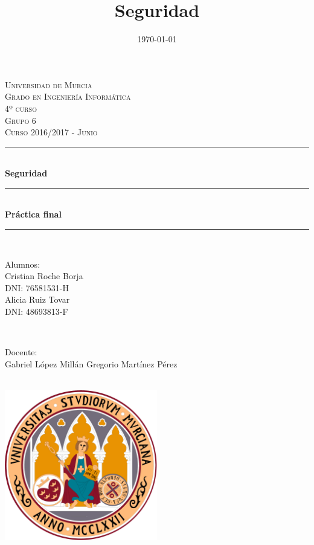 \documentclass[a4,12pt,onecolum]{article}
\title{Seguridad}
\date{\today}
\begin{document}

\begin{titlepage}

\newcommand{\HRule}{\rule{\linewidth}{0.5mm}} %

\center %

\textsc{\LARGE Universidad de Murcia}\\[0.8cm]
\textsc{\Large Grado en Ingeniería Informática}\\[0.5cm]
\textsc{\large 4º curso}\\[0.4cm]
\textsc{\large Grupo 6}\\[0.4cm]
\textsc{\large Curso 2016/2017 - Junio}\\[0.4cm]

\HRule \\[0.6cm]
{ \huge \bfseries Seguridad}\\[0.3cm]
\HRule \\[0.5cm]
{ \Large \bfseries Práctica final}\\[0.3cm]
\HRule \\[1.0cm]


\begin{minipage}{0.4\textwidth}
\begin{flushleft} \large
Alumnos:\\
Cristian Roche Borja \\
\small{DNI: 76581531-H}	\\
\large{Alicia Ruiz Tovar} \\
\small{DNI: 48693813-F}
\end{flushleft}
\end{minipage}
~
\begin{minipage}{0.3\textwidth}
\begin{flushright} \large
Docente: \\
Gabriel López Millán
Gregorio Martínez Pérez
\end{flushright}
\end{minipage}\\[1cm]


\centering
\includegraphics[width=0.5\textwidth]{./portada/logoum.png}\\[0.8cm] %

\end{titlepage}
\end{document}
